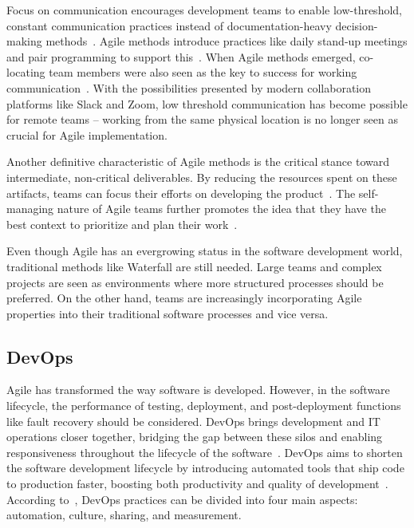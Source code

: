 Focus on communication encourages development teams to enable low-threshold, constant communication practices instead of documentation-heavy decision-making methods~\cite{cohen_introduction_2004}. Agile methods introduce practices like daily stand-up meetings and pair programming to support this~\cite{fowler_agile_2001}. When Agile methods emerged, co-locating team members were also seen as the key to success for working communication~\cite{cohen_introduction_2004}. With the possibilities presented by modern collaboration platforms like Slack and Zoom, low threshold communication has become possible for remote teams – working from the same physical location is no longer seen as crucial for Agile implementation.

Another definitive characteristic of Agile methods is the critical stance toward intermediate, non-critical deliverables. By reducing the resources spent on these artifacts, teams can focus their efforts on developing the product~\cite{cohen_introduction_2004}. The self-managing nature of Agile teams further promotes the idea that they have the best context to prioritize and plan their work~\cite{alshamrani_comparison_2015}.

Even though Agile has an evergrowing status in the software development world, traditional methods like Waterfall are still needed. Large teams and complex projects are seen as environments where more structured processes should be preferred. On the other hand, teams are increasingly incorporating Agile properties into their traditional software processes and vice versa.~\cite{cohen_introduction_2004} 

\subsection{DevOps}

Agile has transformed the way software is developed. However, in the software lifecycle, the performance of testing, deployment, and post-deployment functions like fault recovery should be considered. DevOps brings development and IT operations closer together, bridging the gap between these silos and enabling responsiveness throughout the lifecycle of the software~\cite{hemon-hildgen_agile_2020}. DevOps aims to shorten the software development lifecycle by introducing automated tools that ship code to production faster, boosting both productivity and quality of development~\cite{cois_modern_2014}. According to~\citet{humble_why_2011}, DevOps practices can be divided into four main aspects: automation, culture, sharing, and measurement. 

